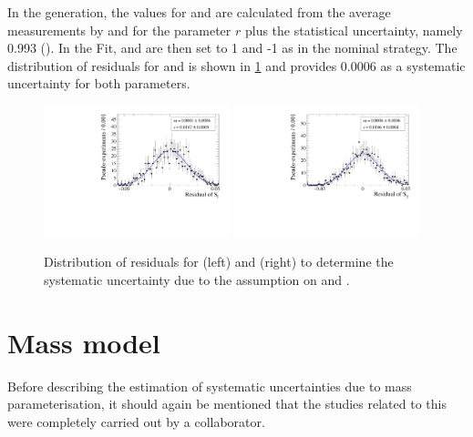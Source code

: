 In the generation, the values for \Cf and \Cfbar are calculated from the average measurements by \belle and \babar for the parameter $r$ plus the statistical uncertainty, namely 0.993 (\cite{Aubert:2008zi, Das:2010be}).
In the Fit, \Cf and \Cfbar are then set to \num{1} and {-1} as in the nominal strategy.
The distribution of residuals for \Sf and \Sfbar is shown in \cref{fig:systUncertC} and provides \num{0.0006} as a systematic uncertainty for both parameters.
\begin{figure}[tbp]
    \centering
    \includegraphics[width=0.48\textwidth]{10Systematics/figs/C_Sf_res.pdf}
    \includegraphics[width=0.48\textwidth]{10Systematics/figs/C_Sfbar_res.pdf}
    \caption{Distribution of residuals for \Sf (left) and \Sfbar (right) to determine the systematic uncertainty due to the assumption on \Cf and \Cfbar.}
    \label{fig:systUncertC}
\end{figure}

\section{Mass model}
\label{sec:SystUncertMass}

Before describing the estimation of systematic uncertainties due to mass parameterisation, it should again be mentioned that the studies related to this were completely carried out by a collaborator.

